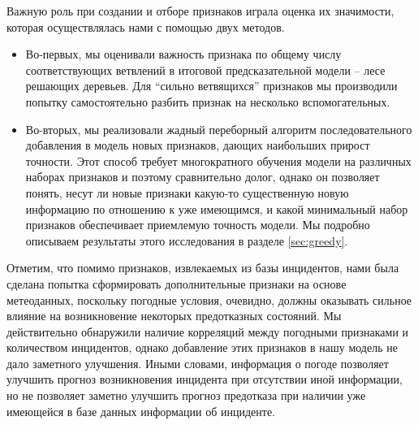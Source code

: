 Важную роль при создании и отборе признаков играла оценка их значимости, которая осуществлялась нами с помощью двух методов. 
\begin{itemize}
\item
Во-первых, мы оценивали важность признака по общему числу соответствующих ветвлений в итоговой предсказательной модели -- лесе решающих деревьев. Для ``сильно ветвящихся'' признаков мы производили попытку самостоятельно разбить признак на несколько вспомогательных. 
\item Во-вторых, мы реализовали жадный переборный алгоритм последовательного добавления в модель новых признаков, дающих наибольших прирост точности. Этот способ требует многократного обучения модели на различных наборах признаков и поэтому сравнительно долог, однако он позволяет понять, несут ли новые признаки какую-то существенную новую информацию по отношению к уже имеющимся, и какой минимальный набор признаков обеспечивает приемлемую точность модели. Мы подробно описываем результаты этого исследования в разделе \ref{sec:greedy}.
\end{itemize}
Отметим, что помимо признаков, извлекаемых из базы инцидентов, нами была сделана попытка сформировать дополнительные признаки на основе метеоданных, поскольку погодные условия, очевидно, должны оказывать сильное влияние на возникновение некоторых предотказных состояний. Мы действительно обнаружили наличие корреляций между погодными признаками и количеством инцидентов, однако добавление этих признаков в нашу модель не дало заметного улучшения. Иными словами, информация о погоде позволяет улучшить прогноз возникновения инцидента при отсутствии иной информации, но не позволяет заметно улучшить прогноз предотказа при наличии уже имеющейся в базе данных информации об инциденте.



